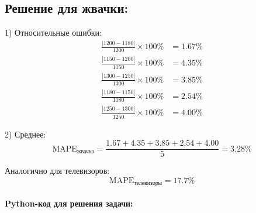 \subsection*{Решение для жвачки:}
1) Относительные ошибки:
\begin{align*}
    \frac{|1200-1180|}{1200} \times 100\% & = 1.67\% \\
    \frac{|1150-1200|}{1150} \times 100\% & = 4.35\% \\
    \frac{|1300-1250|}{1300} \times 100\% & = 3.85\% \\
    \frac{|1180-1150|}{1180} \times 100\% & = 2.54\% \\
    \frac{|1250-1300|}{1250} \times 100\% & = 4.00\%
\end{align*}


2) Среднее:
\[
    \text{MAPE}_{\text{жвачка}} = \frac{1.67 + 4.35 + 3.85 + 2.54 + 4.00}{5} = 3.28\%
\]

Аналогично для телевизоров:
\[
    \text{MAPE}_{\text{телевизоры}} = 17.7\%
\]

\paragraph{Python-код для решения задачи:}

